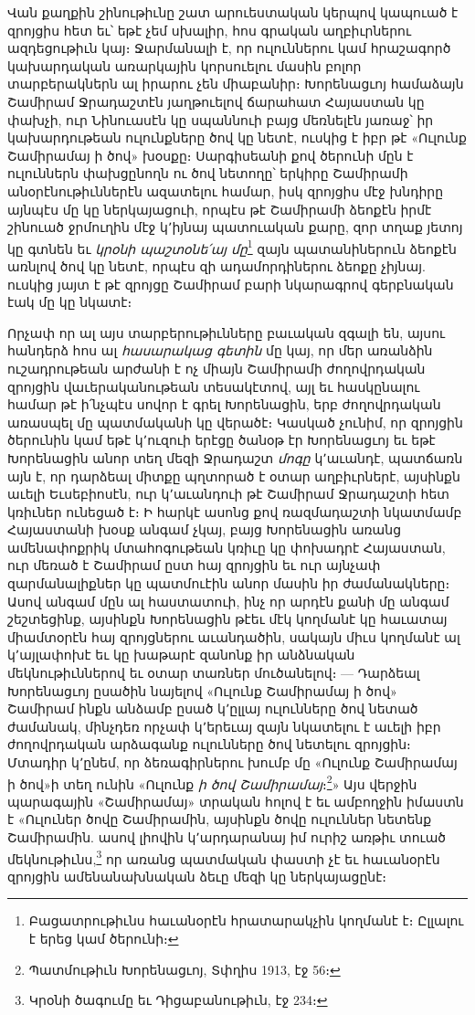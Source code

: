 \documentclass{article}
\begin{document}
{Վան քաղքին շինութիւնը շատ արուեստական կերպով կապուած է զրոյցիս հետ եւ՝ եթէ չեմ սխալիր, հոս գրական աղբիւրներու ազդեցութիւն կայ։ Ջարմանալի է, որ ուլուններու կամ հրաշագործ կախարդական առարկային կորսուելու մասին բոլոր տարբերակներն ալ իրարու չեն միաբանիր։ Խորենացւոյ համաձայն Շամիրամ Ջրադաշտէն յաղթուելով ճարահատ Հայաստան կը փախչի, ուր Նինուասէն կը սպաննուի բայց մեռնելէն յառաջ՝ իր կախարդութեան ուլունքները ծով կը նետէ, ուսկից է իբր թէ «Ուլունք Շամիրամայ ի ծով» խօսքը։ Սարգիսեանի քով ծերունի մըն է ուլուններն փախցընողն ու ծով նետողը՝ երկիրը Շամիրամի անօրէնութիւններէն ազատելու համար, իսկ զրոյցիս մէջ խնդիրը այնպէս մը կը ներկայացուի, որպէս թէ Շամիրամի ձեոքէն իրմէ շինուած ջրմուղին մէջ կ՚իյնայ պատուական քարը, զոր տղաք յետոյ կը գտնեն եւ \emph{կրօնի պաշտօնե՛այ մը}\footnote{Բացատրութիւնս հաւանօրէն հրատարակչին կողմանէ է։ Ըլլալու է երեց կամ ծերունի։} զայն պատանիներուն ձեոքէն առնլով ծով կը նետէ, որպէս զի ադամորդիներու ձեոքը չիյնայ. ուսկից յայտ է թէ զրոյցը Շամիրամ բարի նկարագրով գերբնական էակ մը կը նկատէ։

Որչափ որ ալ այս տարբերութիւնները բաւական զգալի են, այսու հանդերձ հոս ալ \emph{հասարակաց գետին} մը կայ, որ մեր առանձին ուշադրութեան արժանի է ոչ միայն Շամիրամի ժողովրդական զրոյցին վաւերականութեան տեսակէտով, այլ եւ հասկընալու համար թէ ի՛նչպէս սովոր է գրել Խորենացին, երբ ժողովրդական առասպել մը պատմականի կը վերածէ։ Կասկած չունիմ, որ զրոյցին ծերունին կամ եթէ կ՚ուզուի երէցը ծանօթ էր Խորենացւոյ եւ եթէ Խորենացին անոր տեղ մեզի Ջրադաշտ \emph{մոգը} կ՚աւանդէ, պատճառն այն է, որ դարձեալ միտքը պղտորած է օտար աղբիւրներէ, այսինքն աւելի Եւսեբիոսէն, ուր կ՚աւանդուի թէ Շամիրամ Ջրադաշտի հետ կռիւներ ունեցած է։ Ի հարկէ ասոնց քով ռազմադաշտի նկատմամբ Հայաստանի խօսք անգամ չկայ, բայց Խորենացին առանց ամենափոքրիկ մտահոգութեան կռիւը կը փոխադրէ Հայաստան, ուր մեռած է Շամիրամ ըստ հայ զրոյցին եւ ուր այնչափ զարմանալիքներ կը պատմուէին անոր մասին իր ժամանակները։ Ասով անգամ մըն ալ հաստատուի, ինչ որ արդէն քանի մը անգամ շեշտեցինք, այսինքն Խորենացին թէեւ մէկ կողմանէ կը հաւատայ միամտօրէն հայ զրոյցներու աւանդածին, սակայն միւս կողմանէ ալ կ՚այլափոխէ եւ կը խաթարէ զանոնք իր անձնական մեկնութիւններով եւ օտար տառներ մուծանելով։ — Դարձեալ Խորենացւոյ ըսածին նայելով «Ուլունք Շամիրամայ ի ծով» Շամիրամ ինքն անձամբ ըսած կ՚ըլլայ ուլունները ծով նետած ժամանակ, մինչդեռ որչափ կ՚երեւայ զայն նկատելու է աւելի իբր ժողովրդական արձագանք ուլունները ծով նետելու զրոյցին։ Մտադիր կ՚ընեմ, որ ձեռագիրներու խումբ մը «Ուլունք Շամիրամայ ի ծով»ի տեղ ունին «Ուլունք \emph{ի ծով Շամիրամայ}։\footnote{Պատմութիւն Խորենացւոյ, Տփղիս 1913, էջ 56։}» Այս վերջին պարագային «Շամիրամայ» տրական հոլով է եւ ամբողջին իմաստն է «Ուլուներ ծովը Շամիրամին, այսինքն ծովը ուլուններ նետենք Շամիրամին. ասով լիովին կ՚արդարանայ իմ ուրիշ առթիւ տուած մեկնութիւնս,\footnote{Կրօնի ծագումը եւ Դիցաբանութիւն, էջ 234։} որ առանց պատմական փաստի չէ եւ հաւանօրէն զրոյցին ամենանախնական ձեւը մեզի կը ներկայացընէ։

}
\end{document}

